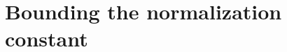 \documentclass[12pt,reqno,tbtags]{amsart}
\newcommand{\inlaw}{\buildrel {\mathcal L} \over =}
\begin{document}

\section{Bounding the normalization constant}\label{gammabounds}
\end{document}

